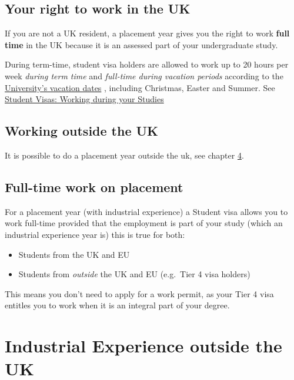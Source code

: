 \documentclass[
]{book}
\providecommand{\tightlist}{%
  \setlength{\itemsep}{0pt}\setlength{\parskip}{0pt}}
\begin{document}
\section{Your right to work in the UK}\label{uk}

If you are not a UK resident, a placement year gives you the right to work \textbf{full time} in the UK because it is an assessed part of your undergraduate study. \citep{righttowork, workingduringstudy}

During term-time, student visa holders are allowed to work up to 20 hours per week \emph{during term time} and \emph{full-time during vacation periods} according to the \href{https://www.manchester.ac.uk/discover/key-dates}{University's vacation dates} \citep{keydates}, including Christmas, Easter and Summer. See \href{https://www.studentsupport.manchester.ac.uk/immigration-and-visas/working/working-during-your-studies/}{Student Visas: Working during your Studies} \citep{workingduringstudy}

\section{Working outside the UK}\label{working-outside-the-uk}

It is possible to do a placement year outside the uk, see chapter \ref{notuk}.

\section{Full-time work on placement}\label{full-time-work-on-placement}

For a placement year (with industrial experience) a Student visa allows you to work full-time provided that the employment is part of your study (which an industrial experience year is) this is true for both:

\begin{itemize}
\tightlist
\item
  Students from the UK and EU
\item
  Students from \emph{outside} the UK and EU (e.g.~Tier 4 visa holders)
\end{itemize}

This means you don't need to apply for a work permit, as your Tier 4 visa entitles you to work when it is an integral part of your degree.

\chapter{Industrial Experience outside the UK}\label{notuk}
\end{document}
